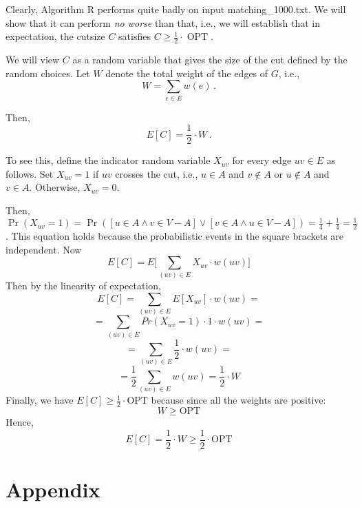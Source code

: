 \documentclass{tufte-handout}
\begin{document}
Clearly, Algorithm R performs quite badly on input 
  matching\_1000.txt.
We will show that it can perform \emph{no worse} than that, i.e., we
will establish that in expectation, the cutsize $C$ satisfies $C \geq
\frac{1}{2}\cdot \operatorname{OPT}$.\


We will view $C$ as a random variable that gives the size of the cut
defined by the random choices.
Let $W$ denote the total weight of the edges of $G$, i.e.,
\[ W= \sum_{e\in E} w(e)\,.\]

Then,
\begin{equation}\label{eq: E[C]}
E[C] = \textstyle\frac{1}{2}\cdot W\,.
\end{equation}

To see this, define the indicator random variable $X_{uv}$ for every
edge $uv\in E$ as follows.
Set $X_{uv}=1$ if $uv$ crosses the cut, i.e., $u\in A$ and $v\notin A$
or $u\notin A$ and $v\in A$.
Otherwise, $X_{uv} = 0$.

Then, $\Pr(X_{uv} = 1) = \Pr([u\in A \land v \in V-A] \lor  [v\in A \land u \in V-A])=\frac{1}{4}+\frac{1}{4}=\frac{1}{2}$. This equation holds because the probabilistic events in the square brackets are independent. Now
\begin{equation*}
	E[C]=E \Big [\sum_{(uv)\in E}X_{uv}\cdot w(uv) \Big]
\end{equation*}
Then by the linearity of expectation,
\begin{equation*}
	E[C] = \sum_{(uv)\in E}E[X_{uv}]\cdot w(uv) =
\end{equation*}
\begin{equation*}
	=\sum_{(uv) \in E} Pr(X_{uv}=1)\cdot 1 \cdot w(uv) =
\end{equation*}
\begin{equation*}
	=\sum_{(uv) \in E} \frac{1}{2}\cdot w(uv) =
\end{equation*}
\begin{equation*}
	=\frac{1}{2}\sum_{(uv) \in E} w(uv) =\frac{1}{2} \cdot W
\end{equation*}
Finally, we have 
\(E[C]\geq \frac1{2}\cdot \text{OPT}\) because since all the weights are positive:
\begin{equation*}
W \geq \text{OPT}
\end{equation*}
Hence,
\begin{equation*}
E[C] = \frac1{2} \cdot W \geq \frac1{2}\cdot \text{OPT}
\end{equation*}


\newpage
\section*{Appendix}
\appendix

\end{document}
